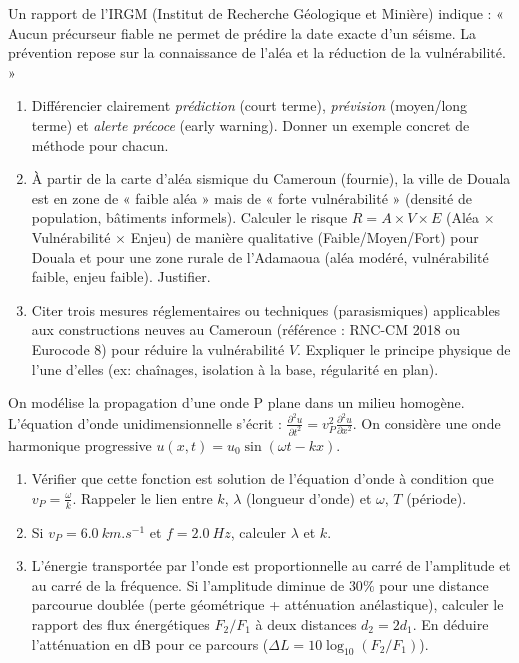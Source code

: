 \documentclass[11pt]{article}
\begin{document}
\begin{exercice}
Un rapport de l'IRGM (Institut de Recherche Géologique et Minière) indique : « Aucun précurseur fiable ne permet de prédire la date exacte d'un séisme. La prévention repose sur la connaissance de l'aléa et la réduction de la vulnérabilité. »

\begin{enumerate}
\item Différencier clairement \textit{prédiction} (court terme), \textit{prévision} (moyen/long terme) et \textit{alerte précoce} (early warning). Donner un exemple concret de méthode pour chacun.
\item À partir de la carte d'aléa sismique du Cameroun (fournie), la ville de Douala est en zone de « faible aléa » mais de « forte vulnérabilité » (densité de population, bâtiments informels). Calculer le risque $R = A \times V \times E$ (Aléa $\times$ Vulnérabilité $\times$ Enjeu) de manière qualitative (Faible/Moyen/Fort) pour Douala et pour une zone rurale de l'Adamaoua (aléa modéré, vulnérabilité faible, enjeu faible). Justifier.
\item Citer trois mesures réglementaires ou techniques (parasismiques) applicables aux constructions neuves au Cameroun (référence : RNC-CM 2018 ou Eurocode 8) pour réduire la vulnérabilité $V$. Expliquer le principe physique de l'une d'elles (ex: chaînages, isolation à la base, régularité en plan).
\end{enumerate}
\end{exercice}

\begin{exercice}
On modélise la propagation d'une onde P plane dans un milieu homogène. L'équation d'onde unidimensionnelle s'écrit : $\frac{\partial^2 u}{\partial t^2} = v_P^2 \frac{\partial^2 u}{\partial x^2}$.
On considère une onde harmonique progressive $u(x,t) = u_0 \sin(\omega t - k x)$.

\begin{enumerate}
\item Vérifier que cette fonction est solution de l'équation d'onde à condition que $v_P = \frac{\omega}{k}$. Rappeler le lien entre $k$, $\lambda$ (longueur d'onde) et $\omega$, $T$ (période).
\item Si $v_P = \SI{6,0}{km.s^{-1}}$ et $f = \SI{2,0}{Hz}$, calculer $\lambda$ et $k$.
\item L'énergie transportée par l'onde est proportionnelle au carré de l'amplitude et au carré de la fréquence. Si l'amplitude diminue de $30\%$ pour une distance parcourue doublée (perte géométrique + atténuation anélastique), calculer le rapport des flux énergétiques $F_2/F_1$ à deux distances $d_2 = 2 d_1$. En déduire l'atténuation en dB pour ce parcours ($\Delta L = 10 \log_{10}(F_2/F_1)$).
\end{enumerate}
\end{exercice}
\end{document}
